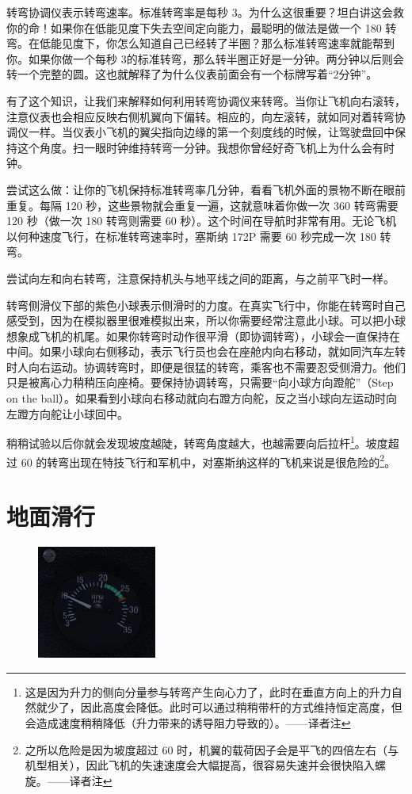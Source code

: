 转弯协调仪表示转弯速率。标准转弯率是每秒 3\textdegree{}。为什么这很重要？坦白讲这会救你的命！如果你在低能见度下失去空间定向能力，最聪明的做法是做一个 180\textdegree{} 转弯。在低能见度下，你怎么知道自己已经转了半圈？那么标准转弯速率就能帮到你。如果你做一个每秒 3\textdegree{}的标准转弯，那么转半圈正好是一分钟。两分钟以后则会转一个完整的圆。这也就解释了为什么仪表前面会有一个标牌写着“2分钟”。

有了这个知识，让我们来解释如何利用转弯协调仪来转弯。当你让飞机向右滚转，注意仪表也会相应反映右侧机翼向下偏转。相应的，向左滚转，就如同对着转弯协调仪一样。当仪表小飞机的翼尖指向边缘的第一个刻度线的时候，让驾驶盘回中保持这个角度。扫一眼时钟维持转弯一分钟。我想你曾经好奇飞机上为什么会有时钟。

尝试这么做：让你的飞机保持标准转弯率几分钟，看看飞机外面的景物不断在眼前重复。每隔 120 秒，这些景物就会重复一遍，这就意味着你做一次 360\textdegree{} 转弯需要 120 秒（做一次 180\textdegree{} 转弯则需要 60 秒）。这个时间在导航时非常有用。无论飞机以何种速度飞行，在标准转弯速率时，塞斯纳 172P 需要 60 秒完成一次 180\textdegree{} 转弯。

尝试向左和向右转弯，注意保持机头与地平线之间的距离，与之前平飞时一样。

转弯侧滑仪下部的紫色小球表示侧滑时的力度。在真实飞行中，你能在转弯时自己感受到，因为在模拟器里很难模拟出来，所以你需要经常注意此小球。可以把小球想象成飞机的机尾。如果你转弯时动作很平滑（即协调转弯），小球会一直保持在中间。如果小球向右侧移动，表示飞行员也会在座舱内向右移动，就如同汽车左转时人向右运动。协调转弯时，即便是很猛的转弯，乘客也不需要忍受侧滑力。他们只是被离心力稍稍压向座椅。要保持协调转弯，只需要“向小球方向蹬舵”（Step on the ball）。如果看到小球向右移动就向右蹬方向舵，反之当小球向左运动时向左蹬方向舵让小球回中。

稍稍试验以后你就会发现坡度越陡，转弯角度越大，也越需要向后拉杆\footnote{这是因为升力的侧向分量参与转弯产生向心力了，此时在垂直方向上的升力自然就少了，因此高度会降低。此时可以通过稍稍带杆的方式维持恒定高度，但会造成速度稍稍降低（升力带来的诱导阻力导致的）。——译者注}。坡度超过 60\textdegree{} 的转弯出现在特技飞行和军机中，对塞斯纳这样的飞机来说是很危险的\footnote{之所以危险是因为坡度超过 60\textdegree{} 时，机翼的载荷因子会是平飞的四倍左右（与机型相关），因此飞机的失速速度会大幅提高，很容易失速并会很快陷入螺旋。——译者注}。

\section{地面滑行}
\label{sec:TaxiTurning}
\begin{figure}
  \includegraphics[width=0.35\textwidth]{img/basic_tutorial/tach}
\end{figure}


